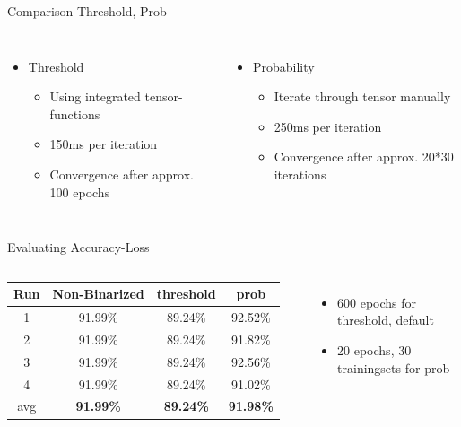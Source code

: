 \documentclass[aspectratio=1610, 12pt]{beamer}
\begin{document}
\begin{frame}{Comparison Threshold, Prob}
	\begin{columns}
		\begin{itemize}
			\item Threshold
			\begin{itemize}
				\item Using integrated tensor-functions
				\item 150ms per iteration
				\item Convergence after approx. 100 epochs
			\end{itemize}
		\end{itemize}
		\begin{itemize}
			\item Probability
			\begin{itemize}
				\item Iterate through tensor manually
				\item 250ms per iteration
				\item Convergence after approx. 20*30 iterations
			\end{itemize}
		\end{itemize}
		

	\end{columns}
\end{frame}

\begin{frame}{Evaluating Accuracy-Loss}
	\begin{columns}
		\column{0.49\textwidth}
		\centering
		\begin{tabular}{|c|c|c|c|}\hline
			Run & Non-Binarized    & threshold        & prob              \\\hline
			1   	& 91.99\%          & 89.24\%          & 92.52\%           \\\hline
			2   & 91.99\%          & 89.24\%          & 91.82\%           \\\hline
			3   & 91.99\%          & 89.24\%          & 92.56\%           \\\hline
			4   & 91.99\%          & 89.24\%          & 91.02\%           \\\hline
			avg & \textbf{91.99\%} & \textbf{89.24\%} & \textbf{91.98\%}  \\\hline
		\end{tabular}
		\column{0.49\textwidth}
		\centering
		\begin{itemize}
			\item 600 epochs for threshold, default
			\item 20 epochs, 30 trainingsets for prob
		\end{itemize}
	\end{columns}
\end{frame}
\end{document}
